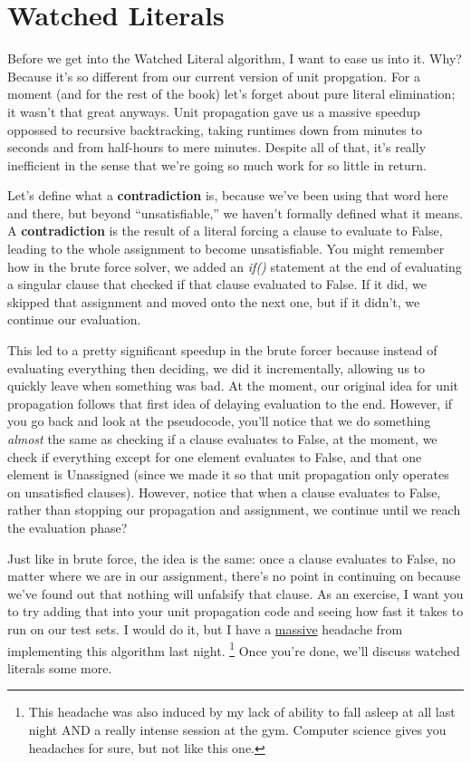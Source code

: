 \section{Watched Literals}

Before we get into the Watched Literal algorithm, I want to ease us into it.
Why? Because it's so different from our current version of unit propgation. 
For a moment (and for the rest of the book) let's forget about pure literal 
elimination; it wasn't that great anyways. Unit propagation gave us a massive speedup 
oppossed to recursive backtracking, taking runtimes down from minutes to seconds and 
from half-hours to mere minutes. Despite all of that, it's really inefficient in the 
sense that we're going so much work for so little in return.

Let's define what a \textbf{contradiction} is, because we've been using that word 
here and there, but beyond ``unsatisfiable,'' we haven't formally defined what it means.
A \textbf{contradiction} is the result of a literal forcing a clause to evaluate to False,
leading to the whole assignment to become unsatisfiable. You might remember how in the 
brute force solver, we added an \textit{if()} statement at the end of evaluating a singular 
clause that checked if that clause evaluated to False. If it did, we skipped that assignment 
and moved onto the next one, but if it didn't, we continue our evaluation. 

This led to a pretty significant speedup in the brute forcer because instead of evaluating everything 
then deciding, we did it incrementally, allowing us to quickly leave when something was bad. 
At the moment, our original idea for unit propagation follows that first idea of delaying 
evaluation to the end. However, if you go back and look at the pseudocode, you'll notice that we 
do something \textit{almost} the same as checking if a clause evaluates to False, at the moment,
we check if everything except for one element evaluates to False, and that one element is Unassigned
(since we made it so that unit propagation only operates on unsatisfied clauses). However, notice 
that when a clause evaluates to False, rather than stopping our propagation and assignment, we 
continue until we reach the evaluation phase? 

Just like in brute force, the idea is the same: once a clause evaluates to False, no matter 
where we are in our assignment, there's no point in continuing on because we've found out that 
nothing will unfalsify that clause. As an exercise, I want you to try adding that into your 
unit propagation code and seeing how fast it takes to run on our test sets. I would do it, but 
I have a \underline{massive} headache from implementing this algorithm last night.
\footnote{This headache was also induced by my lack of ability to fall asleep at all last night
AND a really intense session at the gym. Computer science gives you headaches for sure, but not like 
this one.}
Once you're done, we'll discuss watched literals some more.


